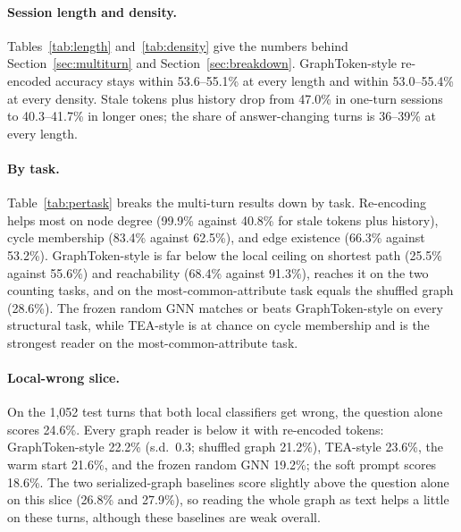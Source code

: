 \documentclass[11pt]{article}
\begin{document}
\paragraph{Session length and density.}
Tables~\ref{tab:length} and~\ref{tab:density} give the numbers behind Section~\ref{sec:multiturn} and Section~\ref{sec:breakdown}.
GraphToken-style re-encoded accuracy stays within 53.6--55.1\% at every length and within 53.0--55.4\% at every density.
Stale tokens plus history drop from 47.0\% in one-turn sessions to 40.3--41.7\% in longer ones; the share of answer-changing turns is 36--39\% at every length.

\paragraph{By task.}
Table~\ref{tab:pertask} breaks the multi-turn results down by task.
Re-encoding helps most on node degree (99.9\% against 40.8\% for stale tokens plus history), cycle membership (83.4\% against 62.5\%), and edge existence (66.3\% against 53.2\%).
GraphToken-style is far below the local ceiling on shortest path (25.5\% against 55.6\%) and reachability (68.4\% against 91.3\%), reaches it on the two counting tasks, and on the most-common-attribute task equals the shuffled graph (28.6\%).
The frozen random GNN matches or beats GraphToken-style on every structural task, while TEA-style is at chance on cycle membership and is the strongest reader on the most-common-attribute task.

\paragraph{Local-wrong slice.}
On the 1{,}052 test turns that both local classifiers get wrong, the question alone scores 24.6\%.
Every graph reader is below it with re-encoded tokens: GraphToken-style 22.2\% (s.d.\ 0.3; shuffled graph 21.2\%), TEA-style 23.6\%, the warm start 21.6\%, and the frozen random GNN 19.2\%; the soft prompt scores 18.6\%.
The two serialized-graph baselines score slightly above the question alone on this slice (26.8\% and 27.9\%), so reading the whole graph as text helps a little on these turns, although these baselines are weak overall.
\end{document}
